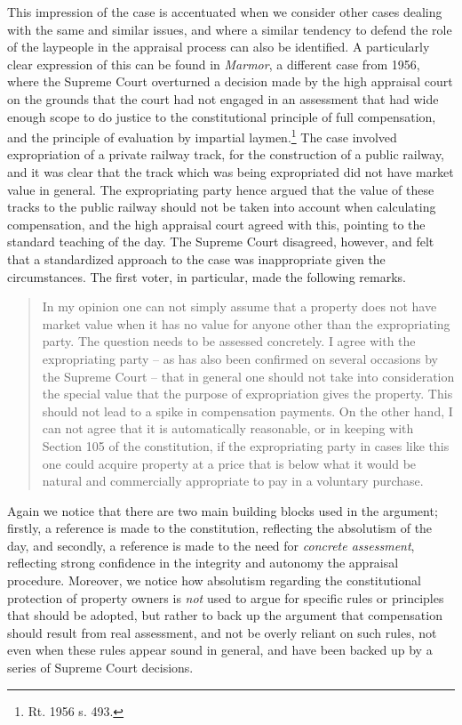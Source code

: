 This impression of the case is accentuated when we consider other cases dealing with the same and similar issues, and where a similar tendency to defend the role of the laypeople in the appraisal process can also be identified. A particularly clear expression of this can be found in \emph{Marmor}, a different case from 1956, where the Supreme Court overturned a decision made by the high appraisal court on the grounds that the court had not engaged in an assessment that had wide enough scope to do justice to the constitutional principle of full compensation, and the principle of evaluation by impartial laymen.\footnote{Rt. 1956 s. 493.} The case involved expropriation of a private railway track, for the construction of a public railway, and it was clear that the track which was being expropriated did not have market value in general. The expropriating party hence argued that the value of these tracks to the public railway should not be taken into account when calculating compensation, and the high appraisal court agreed with this, pointing to the standard teaching of the day. The Supreme Court disagreed, however, and felt that a standardized approach to the case was inappropriate given the circumstances. The first voter, in particular, made the following remarks.

\begin{quote}
In my opinion one can not simply assume that a property does not have market value when it has no value for anyone other than the expropriating party. The question needs to be assessed concretely. I agree with the expropriating party -- as has also been confirmed on several occasions by the Supreme Court -- that in general one should not take into consideration the special value that the purpose of expropriation gives the property. This should not lead to a spike in compensation payments. On the other hand, I can not agree that it is automatically reasonable, or in keeping with Section 105 of the constitution, if the expropriating party in cases like this one could acquire property at a price that is below what it would be natural and commercially appropriate to pay in a voluntary purchase.
\end{quote}

Again we notice that there are two main building blocks used in the argument; firstly, a reference is made to the constitution, reflecting the absolutism of the day, and secondly, a reference is made to the need for \emph{concrete assessment}, reflecting strong confidence in the integrity and autonomy the appraisal procedure. Moreover, we notice how absolutism regarding the constitutional protection of property owners is \emph{not} used to argue for specific rules or principles that should be adopted, but rather to back up the argument that compensation should result from real assessment, and not be overly reliant on such rules, not even when these rules appear sound in general, and have been backed up by a series of Supreme Court decisions.

